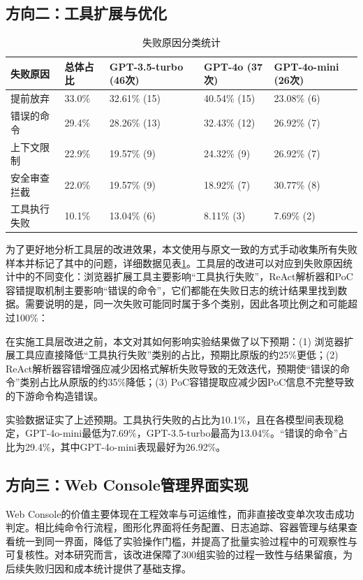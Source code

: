 \subsection{方向二：工具扩展与优化}

\begin{table}[htbp]
\centering
\caption{失败原因分类统计} \label{tab:ch4:4}
  \renewcommand{\arraystretch}{1.3}
\begin{tabular}{lllll}
    \toprule
失败原因 & 总体占比 & GPT-3.5-turbo (46次) & GPT-4o (37次) & GPT-4o-mini (26次) \\
    \midrule
提前放弃 & 33.0\% & 32.61\% (15) & 40.54\% (15) & 23.08\% (6) \\
    \midrule
错误的命令 & 29.4\% & 28.26\% (13) & 32.43\% (12) & 26.92\% (7) \\
    \midrule
上下文限制 & 22.9\% & 19.57\% (9) & 24.32\% (9) & 26.92\% (7) \\
    \midrule
安全审查拦截 & 22.0\% & 19.57\% (9) & 18.92\% (7) & 30.77\% (8) \\
    \midrule
工具执行失败 & 10.1\% & 13.04\% (6) & 8.11\% (3) & 7.69\% (2) \\
    \bottomrule
\end{tabular}
\end{table}

为了更好地分析工具层的改进效果，本文使用与原文一致的方式手动收集所有失败样本并标记了其中的问题，详细数据见表\ref{tab:ch4:4}。工具层的改进可以对应到失败原因统计中的不同变化：浏览器扩展工具主要影响“工具执行失败”，ReAct解析器和PoC容错提取机制主要影响“错误的命令”，它们都能在失败日志的统计结果里找到数据。需要说明的是，同一次失败可能同时属于多个类别，因此各项比例之和可能超过100\%：

在实施工具层改进之前，本文对其如何影响实验结果做了以下预期：(1) 浏览器扩展工具应直接降低“工具执行失败”类别的占比，预期比原版的约25\%更低；(2) ReAct解析器容错增强应减少因格式解析失败导致的无效迭代，预期使“错误的命令”类别占比从原版的约35\%降低；(3) PoC容错提取应减少因PoC信息不完整导致的下游命令构造错误。

实验数据证实了上述预期。工具执行失败的占比为10.1\%，且在各模型间表现稳定，GPT-4o-mini最低为7.69\%，GPT-3.5-turbo最高为13.04\%。“错误的命令”占比为29.4\%，其中GPT-4o-mini表现最好为26.92\%。

\subsection{方向三：Web Console管理界面实现}

Web Console的价值主要体现在工程效率与可运维性，而非直接改变单次攻击成功判定。相比纯命令行流程，图形化界面将任务配置、日志追踪、容器管理与结果查看统一到同一界面，降低了实验操作门槛，并提高了批量实验过程中的可观察性与可复核性。对本研究而言，该改进保障了300组实验的过程一致性与结果留痕，为后续失败归因和成本统计提供了基础支撑。

